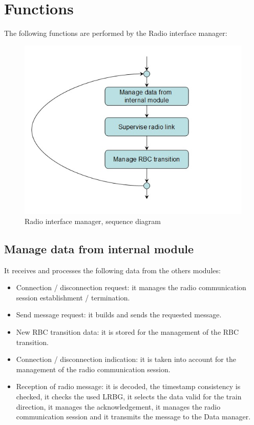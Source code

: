 \documentclass[nocc]{template/openetcs_report}
\begin{document}
\section{Functions}
The following functions are performed by the Radio interface manager:
\begin{figure}[!h]
  \centering
  \includegraphics[width=\textwidth]{image/evc_radio_interf_manager}
  \caption{Radio interface manager, sequence diagram}
  \label{fig:Radio interface manager, sequence diagram}
\end{figure}
\subsection{Manage data from internal module}
It receives and processes the following data from the others modules:
\begin{itemize}
\item Connection / disconnection request: it manages the radio communication session establishment / termination.
\item Send message request: it builds and sends the requested message.
\item New RBC transition data: it is stored for the management of the RBC transition.
\item Connection / disconnection indication: it is taken into account for the management of the radio communication session.
\item Reception of radio message: it is decoded, the timestamp consistency is checked, it checks the used LRBG, it selects the data valid for the train direction, it manages the acknowledgement, it manages the radio communication session and it transmits the message to the Data manager.
\end{itemize}
\end{document}

